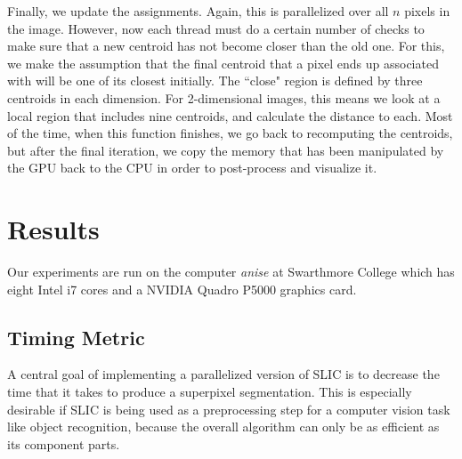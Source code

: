 \documentclass[11pt,twocolumn]{article}
\begin{document}
Finally, we update the assignments. Again, this is parallelized over all $n$ pixels in the image. However, now each thread must do a certain number of checks to make sure that a new centroid has not become closer than the old one. For this, we make the assumption that the final centroid that a pixel ends up associated with will be one of its closest initially. The ``close" region is defined by three centroids in each dimension. For 2-dimensional images, this means we look at a local region that includes nine centroids, and calculate the distance to each. Most of the time, when this function finishes, we go back to recomputing the centroids, but after the final iteration, we copy the memory that has been manipulated by the GPU back to the CPU in order to post-process and visualize it.

\section {Results}\label{results}
Our experiments are run on the computer \textit{anise} at Swarthmore College which has eight Intel i7 cores and a NVIDIA Quadro P5000 graphics card.

\subsection{Timing Metric}
A central goal of implementing a parallelized version of SLIC is to decrease the time that it takes to produce a superpixel segmentation. This is especially desirable if SLIC is being used as a preprocessing step for a computer vision task like object recognition, because the overall algorithm can only be as efficient as its component parts.
\end{document}

